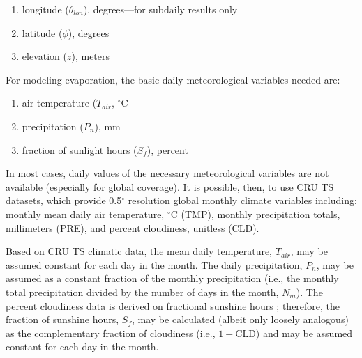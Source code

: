 \begin{enumerate}
	\item longitude ($\theta_{lon}$), degrees---for subdaily results only
	\item latitude ($\phi$), degrees
	\item elevation ($z$), meters
\end{enumerate} 
 
For modeling evaporation, the basic daily meteorological variables needed are: 
\begin{enumerate}
	\item air temperature ($T_{air}$, $^{\circ}$C
	\item precipitation ($P_n$), mm
	\item fraction of sunlight hours ($S_f$), percent
\end{enumerate}

In most cases, daily values of the necessary meteorological variables are not available (especially for global coverage). 
It is possible, then, to use CRU TS datasets\footnotemark, which provide 0.5$^{\circ}$ resolution global monthly climate variables including: monthly mean daily air temperature, $^{\circ}$C (TMP), monthly precipitation totals, millimeters (PRE), and percent cloudiness, unitless (CLD). 

Based on CRU TS climatic data, the mean daily temperature, $T_{air}$, may be assumed constant for each day in the month. 
The daily precipitation, $P_n$, may be assumed as a constant fraction of the monthly precipitation (i.e., the monthly total precipitation divided by the number of days in the month, $N_m$). 
The percent cloudiness data is derived on fractional sunshine hours \parencite{harris14}; therefore, the fraction of sunshine hours, $S_f$, may be calculated (albeit only loosely analogous) as the complementary fraction of cloudiness (i.e., $1-$CLD) and may be assumed constant for each day in the month.

